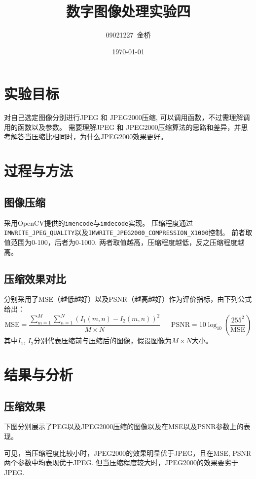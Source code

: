 \documentclass{article}
\title{数字图像处理实验四}
\author{09021227~金桥}
\date{\today}
\begin{document}
\maketitle

\section{实验目标}

对自己选定图像分别进行JPEG 和 JPEG2000压缩, 可以调用函数，不过需理解调用的函数以及参数。
需要理解JPEG 和 JPEG2000压缩算法的思路和差异，并思考解答当压缩比相同时，为什么JPEG2000效果更好。
\section{过程与方法}

\subsection{图像压缩}

采用OpenCV提供的\texttt{imencode}与\texttt{imdecode}实现。
压缩程度通过\texttt{IMWRITE\_JPEG\_QUALITY}以及\texttt{IMWRITE\_JPEG2000\_COMPRESSION\_X1000}控制。
前者取值范围为0-100，后者为0-1000. 两者取值越高，压缩程度越低，反之压缩程度越高。

\subsection{压缩效果对比}

分别采用了MSE（越低越好）以及PSNR（越高越好）作为评价指标，由下列公式给出：
$$\text{MSE} = \frac{\sum_{m = 1}^M \sum_{n=1}^N (I_1(m, n)-I_2(m, n))^2}{M\times N}\ \ \ \ \ \ \ \text{PSNR} = 10\log_{10}(\frac{255^2}{\text{MSE}})$$
其中$I_1$, $I_2$分别代表压缩前与压缩后的图像，假设图像为$M\times N$大小。
\section{结果与分析}

\subsection{压缩效果}

下图分别展示了PEG以及JPEG2000压缩的图像以及在MSE以及PSNR参数上的表现。

可见，当压缩程度比较小时，JPEG2000的效果明显优于JPEG，且在MSE, PSNR两个参数中均表现优于JPEG.
但当压缩程度较大时，JPEG2000的效果要劣于JPEG.
\end{document}
